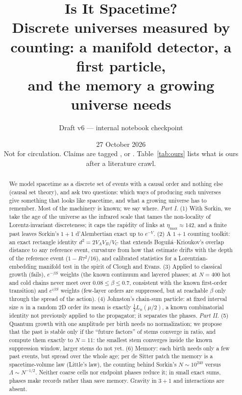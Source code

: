\documentclass[11pt,a4paper]{article}
\title{Is It Spacetime?\\[4pt]
\large Discrete universes measured by counting: a manifold detector, a first particle,\\ and the memory a growing universe needs}
\author{Draft v6 --- internal notebook checkpoint}
\date{27 October 2026\\[2pt]\small Not for circulation. Claims are tagged \est, \lit{} or \ours. Table~\ref{tab:ours} lists what is ours after a literature crawl.}
\begin{document}
\maketitle

\begin{abstract}
We model spacetime as a discrete set of events with a causal order and nothing else (causal set theory), and ask two questions: which ways of producing such universes give something that looks like spacetime, and what a growing universe has to remember. Most of the machinery is known; we say where. \emph{Part I.} (1) With Sorkin, we take the age of the universe as the infrared scale that tames the non-locality of Lorentz-invariant discreteness; it caps the rapidity of links at $\eta_{\max}\approx142$, and a finite past leaves Sorkin's $1+1$ d'Alembertian exact up to $e^{-V}$. (2) A $1+1$ counting toolkit: an exact rectangle identity $d^2=2V_AV_B/V_C$ that extends Bogu\~n\'a--Krioukov's overlap distance to any reference event, curvature from how that estimate drifts with the depth of the reference event ($1-R\tau^2/16$), and calibrated statistics for a Lorentzian-embedding manifold test in the spirit of Clough and Evans. (3) Applied to classical growth (fails), $e^{-\beta S}$ weights (the known continuum and layered phases; at $N=400$ hot and cold chains never meet over $0.08\le\beta\le0.7$, consistent with the known first-order transition) and $e^{i\beta S}$ weights (few-layer orders are suppressed, but at reachable $\beta$ only through the spread of the action). (4) Johnston's chain-sum particle: at fixed interval size $n$ in a random 2D order its mean is exactly $\tfrac12L_n(\mu/2)$, a known combinatorial identity not previously applied to the propagator; it separates the phases. \emph{Part II.} (5) Quantum growth with one amplitude per birth needs no normalization; we propose that the past is stable only if the ``future factors'' of stems converge in ratio, and compute them exactly to $N=11$: the smallest stem converges inside the known suppression window, larger stems do not yet. (6) Memory: each birth needs only a few past events, but spread over the whole age; per de Sitter patch the memory is a spacetime-volume law (Little's law), the counting behind Sorkin's $N\sim10^{240}$ versus $\Lambda\sim N^{-1/2}$. Neither coarse cells nor endpoint phases reduce it; in small exact sums, phases make records rather than save memory. Gravity in $3+1$ and interactions are absent.
\end{abstract}
\end{document}

